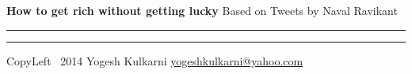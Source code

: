 

\usepackage{beamerarticle} %



\begin{center}
     \Large{\textbf{How to get rich without getting lucky} \small{Based on Tweets by Naval Ravikant}}  %
\end{center}
\rule{\linewidth}{0.25pt}
\raggedright
\footnotesize
\begin{multicols}{3}




\rule{0.3\linewidth}{0.25pt}

\scriptsize
CopyLeft \textcopyleft\ 2014 Yogesh Kulkarni
\href{http://www.yogeshkulkarni.com}{yogeshkulkarni@yahoo.com}

\end{multicols}

